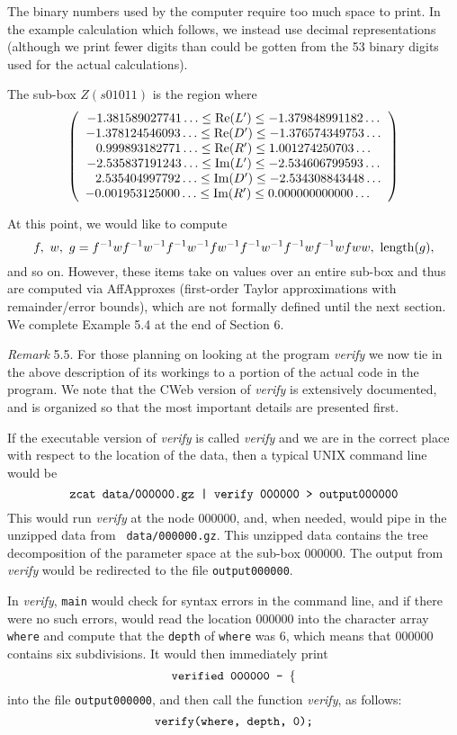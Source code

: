 The binary numbers used by the computer require too much space to print.
In the example calculation which follows, we instead use decimal 
representations (although we print fewer digits than could
be gotten from the 53 binary digits used for the actual calculations).

The sub-box $Z(s01011)$ is the region where 
$$\left(\begin{array}{c} 
-1.381589027741\ldots  \le  {\rm Re}(L')  \le  -1.379848991182\ldots\cr
-1.378124546093\ldots  \le  {\rm Re}(D')  \le  -1.376574349753\ldots\cr
0.999893182771\ldots  \le {\rm Re}(R')  \le  1.001274250703\ldots\cr
-2.535837191243\ldots  \le  {\rm Im}(L')  \le  -2.534606799593\ldots\cr
\phantom{-}2.535404997792\ldots  \le  {\rm Im}(D')  \le  -2.534308843448\ldots\cr
-0.001953125000\ldots  \le  {\rm Im}(R')  \le  0.000000000000\ldots\phantom{-}\cr
\end{array}\right)$$


At this point, we would like to compute $$f,\ w,\ g = f^{-1}wf^{-1}w^{-1}f^{-1}w^{-1}fw^{-1}f^{-1}w^{-1}f^{-1}wf^{-1}wfww, \ {\rm length}(g),$$ 
\noindent 
and so on.  
However, these items take on values over an entire sub-box and thus are computed via AffApproxes (first-order Taylor
approximations with remainder/error bounds), which are not formally defined until the next section.  We
complete Example 5.4 at the end of Section 6.

 {\it Remark} 5.5.  For those planning on looking at the program {\it verify}
we now tie in the above description of its workings to a portion of the actual code in the program.  We note that the CWeb version of {\it verify} is extensively documented, and is organized so that the most important details are presented first.

If the executable version of {\it verify} is called {\it verify} and we are in the correct place with respect to the location of the data, then a typical UNIX command line would be 
$$
\hbox{\tt zcat data/000000.gz | verify 000000 > output000000} 
$$
This would run {\it verify} at the node 000000, and, when needed, would pipe in the unzipped data from \hbox{\tt
data/000000.gz}.  This unzipped data contains the tree decomposition of the parameter space at the sub-box 000000. 
The output from {\it verify} would be redirected to the file \hbox{\tt output000000}.

In {\it verify}, \hbox{\tt main} would check for syntax errors in the command line, and if there were no such errors, would read the location 000000 into the character array \hbox{\tt where}  and compute that the \hbox{\tt depth} of \hbox{\tt where} was 6, which means that 000000 contains
six subdivisions.   It would then immediately print 
$$
\hbox{\tt verified 000000 - } \{$$
into the file \hbox{\tt output000000}, and then call the function {\it verify}, as follows:
$$
\hbox{\tt verify(where, depth, 0);}
$$

